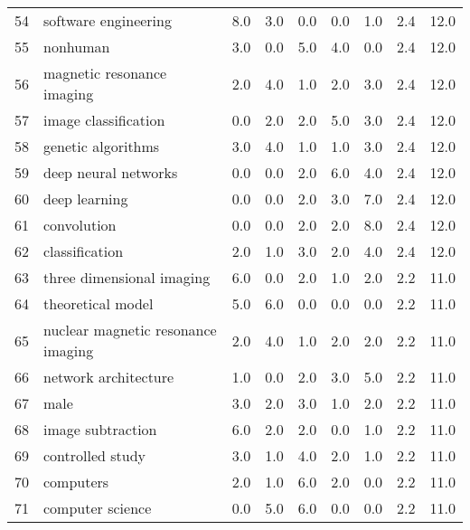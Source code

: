 \begin{tabular}{llrrrrrrr}
54 &                     software engineering &   8.0 &   3.0 &   0.0 &   0.0 &   1.0 &   2.4 &   12.0 \\
55 &                                 nonhuman &   3.0 &   0.0 &   5.0 &   4.0 &   0.0 &   2.4 &   12.0 \\
56 &               magnetic resonance imaging &   2.0 &   4.0 &   1.0 &   2.0 &   3.0 &   2.4 &   12.0 \\
57 &                     image classification &   0.0 &   2.0 &   2.0 &   5.0 &   3.0 &   2.4 &   12.0 \\
58 &                       genetic algorithms &   3.0 &   4.0 &   1.0 &   1.0 &   3.0 &   2.4 &   12.0 \\
59 &                     deep neural networks &   0.0 &   0.0 &   2.0 &   6.0 &   4.0 &   2.4 &   12.0 \\
60 &                            deep learning &   0.0 &   0.0 &   2.0 &   3.0 &   7.0 &   2.4 &   12.0 \\
61 &                              convolution &   0.0 &   0.0 &   2.0 &   2.0 &   8.0 &   2.4 &   12.0 \\
62 &                           classification &   2.0 &   1.0 &   3.0 &   2.0 &   4.0 &   2.4 &   12.0 \\
63 &                three dimensional imaging &   6.0 &   0.0 &   2.0 &   1.0 &   2.0 &   2.2 &   11.0 \\
64 &                        theoretical model &   5.0 &   6.0 &   0.0 &   0.0 &   0.0 &   2.2 &   11.0 \\
65 &       nuclear magnetic resonance imaging &   2.0 &   4.0 &   1.0 &   2.0 &   2.0 &   2.2 &   11.0 \\
66 &                     network architecture &   1.0 &   0.0 &   2.0 &   3.0 &   5.0 &   2.2 &   11.0 \\
67 &                                     male &   3.0 &   2.0 &   3.0 &   1.0 &   2.0 &   2.2 &   11.0 \\
68 &                        image subtraction &   6.0 &   2.0 &   2.0 &   0.0 &   1.0 &   2.2 &   11.0 \\
69 &                         controlled study &   3.0 &   1.0 &   4.0 &   2.0 &   1.0 &   2.2 &   11.0 \\
70 &                                computers &   2.0 &   1.0 &   6.0 &   2.0 &   0.0 &   2.2 &   11.0 \\
71 &                         computer science &   0.0 &   5.0 &   6.0 &   0.0 &   0.0 &   2.2 &   11.0 \\

\end{tabular}
